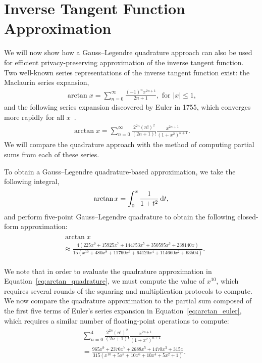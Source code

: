 \section{Inverse Tangent Function Approximation}
We will now show how a Gauss--Legendre quadrature approach can also be used for efficient privacy-preserving approximation of the inverse tangent function. Two well-known series representations of the inverse tangent function exist: the Maclaurin series expansion,
\begin{align} \label{eq:arctan_maclaurin}
	\arctan x = \sum_{n=0}^{\infty}{\frac{(-1)^nx^{2n+1}}{2n+1}}, \text{ for }|x|\leq 1,
\end{align}
and the following series expansion discovered by Euler in 1755, which converges more rapidly for all $x$~\cite{chien-lih_89.67_2005}.
\begin{align} \label{eq:arctan_euler}
	\arctan x = \sum_{n=0}^{\infty}
	{
	\frac
		{2^{2n}(n!)^2}
		{(2n+1)!}
	\frac
		{x^{2n+1}}
		{(1+x^2)^{n+1}}
	}.
\end{align}
We will compare the quadrature approach with the method of computing partial sums from each of these series.

To obtain a Gauss--Legendre quadrature-based approximation, we take the following integral,
\begin{align*}
	\arctan x = \int_0^x{\frac{1}{1+t^2}\mathop{}\!\mathrm{d} t},
\end{align*}
and perform five-point Gauss--Legendre quadrature to obtain the following closed-form approximation:
\begin{align} \label{eq:arctan_quadrature}
	\begin{split}
		&\arctan x \\
		&\approx \frac
		{4\left(225x^9 + 15925x^7 + 144753x^5 + 350595x^3 + 238140x\right)}
		{15\left(x^{10} + 480x^8 + 11760x^6 + 64120x^4 + 114660x^2 + 63504\right)}.
	\end{split}
\end{align}

We note that in order to evaluate the quadrature approximation in Equation~\ref{eq:arctan_quadrature}, we must compute the value of $x^{10}$, which requires several rounds of the squaring and multiplication protocols to compute. We now compare the quadrature approximation to the partial sum composed of the first five terms of Euler's series expansion in Equation~\ref{eq:arctan_euler}, which requires a similar number of floating-point operations to compute:
\begin{align} \label{eq:arctan_euler_partial}
	\begin{split}
		&\sum_{n=0}^{4}
		{
		\frac
			{2^{2n}(n!)^2}
			{(2n+1)!}
		\frac
			{x^{2n+1}}
			{(1+x^2)^{n+1}}
		}\\
		&= \frac
		{965x^9 + 2370x^7 + 2688x^5 + 1470x^3 + 315x}
		{315\left(x^{10} + 5x^8 + 10x^6 + 10x^4 + 5x^2 + 1\right)}.
	\end{split}
\end{align}

